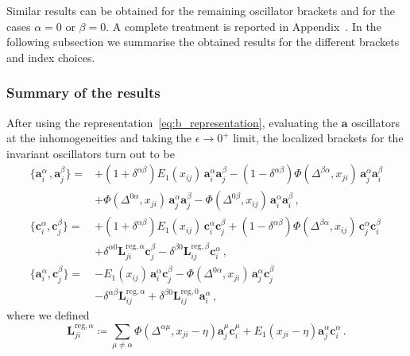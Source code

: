 Similar results can be obtained for the remaining oscillator brackets and for the cases $\alpha=0$ or $\beta=0$. A complete treatment is reported in Appendix~. In the following subsection we summarise the obtained results for the different brackets and index choices.


\subsubsection{Summary of the results}

After using the representation~\eqref{eq:b_representation}, evaluating the $\mathbf{a}$ oscillators at the inhomogeneities and taking the $\epsilon \to 0^+$ limit, 
the localized brackets for the invariant oscillators turn out to be 
\begin{equation}
\label{eq:oscillator_final_inhom}
\begin{split}
\{\mathbf{a}_i^\alpha \,,\mathbf{a}_j^\beta \}=&+ (1+\delta^{\alpha\beta}) E_1(x_{ij})\,\mathbf{a}_i^\alpha \mathbf{a}_j^\beta - (1-\delta^{\alpha\beta})\Phi(\Delta^{\beta \alpha}, x_{ji})\,\mathbf{a}_j^\alpha \mathbf{a}_i^\beta  \\
&+ \Phi(\Delta^{0\alpha}, x_{ji})\,\mathbf{a}_j^\alpha \mathbf{a}_j^\beta - \Phi(\Delta^{0\beta}, x_{ij})\,\mathbf{a}_i^\alpha \mathbf{a}_i^\beta \,,\\
\{\mathbf{c}_i^\alpha,\mathbf{c}_j^\beta\}  =&+ (1+\delta^{\alpha\beta}) E_1(x_{ij})\,\mathbf{c}_i^\alpha \mathbf{c}_j^\beta  +(1-\delta^{\alpha\beta}) \Phi(\Delta^{\beta \alpha}, x_{ij})\,\mathbf{c}_j^\alpha \mathbf{c}_i^\beta \\
&+\delta^{\alpha0} \mathbf{L}^{\text{reg},\alpha}_{ji} \mathbf{c}_j^\beta -\delta^{\beta0} \mathbf{L}^{\text{reg},\beta}_{ij} \mathbf{c}_i^\alpha   \,,\\
\{\mathbf{a}_i^\alpha, \mathbf{c}_j^\beta\}=&- E_1(x_{ij})\,\mathbf{a}_i^\alpha \mathbf{c}_j^\beta - \Phi(\Delta^{0\alpha}, x_{ji})\,\mathbf{a}_j^\alpha \mathbf{c}_j^\beta \\
&-\delta^{\alpha\beta} \mathbf{L}^{\text{reg},\alpha}_{ij} +\delta^{\beta0} \mathbf{L}^{\text{reg},0}_{ij} \mathbf{a}_i^\alpha \,,
\end{split}
\end{equation}
where we defined
\begin{equation}
\label{eq:Lreg_ba_alpha}
\mathbf{L}^{\text{reg},\alpha}_{ji} \coloneq \sum_{\mu \ne \alpha}  \Phi(\Delta^{\alpha\mu}, x_{ji} - \eta) \mathbf{a}_j^\mu \mathbf{c}_i^\mu+E_1(x_{ji} - \eta) \mathbf{a}_j^\alpha \mathbf{c}_i^\alpha \,.
\end{equation}
